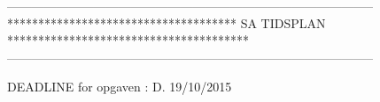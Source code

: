-----------------------------------------------------------------------------------------
************************************* SA TIDSPLAN ***************************************
-----------------------------------------------------------------------------------------

DEADLINE for opgaven : D. 19/10/2015



